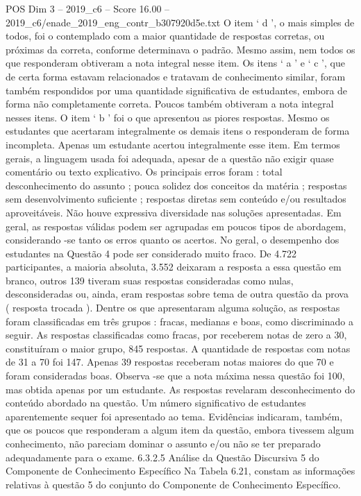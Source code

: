 \begin{textsample}{POS Dim 3 – 2019\_c6 – Score 16.00 – 2019\_c6/enade\_2019\_eng\_contr\_b307920d5e.txt}
O item ‘ d ’, o mais simples de todos, foi o contemplado com a maior quantidade de respostas corretas, ou próximas da correta, conforme determinava o padrão.
Mesmo assim, nem todos os que responderam obtiveram a nota integral nesse item.
Os itens ‘ a ’ e ‘ c ’, que de certa forma estavam relacionados e tratavam de conhecimento similar, foram também respondidos por uma quantidade significativa de estudantes, embora de forma não completamente correta.
Poucos também obtiveram a nota integral nesses itens.
O item ‘ b ’ foi o que apresentou as piores respostas.
Mesmo os estudantes que acertaram integralmente os demais itens o responderam de forma incompleta.
Apenas um estudante acertou integralmente esse item.
Em termos gerais, a linguagem usada foi adequada, apesar de a questão não exigir quase comentário ou texto explicativo.
Os principais erros foram : total desconhecimento do assunto ; pouca solidez dos conceitos da matéria ; respostas sem desenvolvimento suficiente ; respostas diretas sem conteúdo e/ou resultados aproveitáveis.
Não houve expressiva diversidade nas soluções apresentadas.
Em geral, as respostas válidas podem ser agrupadas em poucos tipos de abordagem, considerando -se tanto os erros quanto os acertos.
No geral, o desempenho dos estudantes na Questão 4 pode ser considerado muito fraco.
De 4.722 participantes, a maioria absoluta, 3.552 deixaram a resposta a essa questão em branco, outros 139 tiveram suas respostas consideradas como nulas, desconsideradas ou, ainda, eram respostas sobre tema de outra questão da prova ( resposta trocada ).
Dentre os que apresentaram alguma solução, as respostas foram classificadas em três grupos : fracas, medianas e boas, como discriminado a seguir.
As respostas classificadas como fracas, por receberem notas de zero a 30, constituíram o maior grupo, 845 respostas.
A quantidade de respostas com notas de 31 a 70 foi 147.
Apenas 39 respostas receberam notas maiores do que 70 e foram consideradas boas.
Observa -se que a nota máxima nessa questão foi 100, mas obtida apenas por um estudante.
As respostas revelaram desconhecimento do conteúdo abordado na questão.
Um número significativo de estudantes aparentemente sequer foi apresentado ao tema.
Evidências indicaram, também, que os poucos que responderam a algum item da questão, embora tivessem algum conhecimento, não pareciam dominar o assunto e/ou não se ter preparado adequadamente para o exame. 6.3.2.5 Análise da Questão Discursiva 5 do Componente de Conhecimento Específico Na Tabela 6.21, constam as informações relativas à questão 5 do conjunto do Componente de Conhecimento Específico.

\end{textsample}
